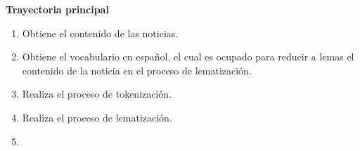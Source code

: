 

\begin{large}
	\textbf{Trayectoria principal}\\
\end{large}	

\begin{enumerate}[1.]

	
	\item \sistema Obtiene el contenido de las noticias.

	\item \sistema Obtiene el vocabulario en español, el cual es ocupado para reducir a lemas el contenido de la noticia en el proceso de lematización.

	\item \sistema Realiza el proceso de tokenización.

	\item \sistema Realiza el proceso de lematización.
	
	\item \finCU	

\end{enumerate}

  